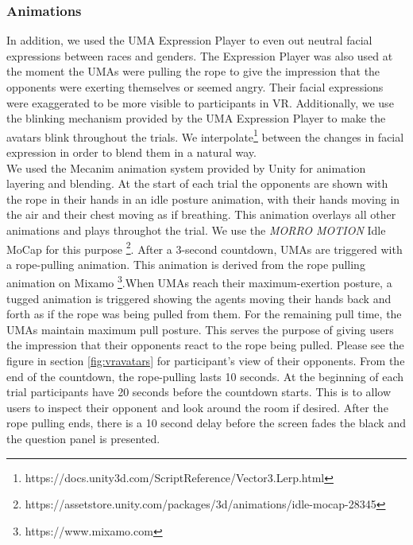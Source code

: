 \subsubsection{Animations}
\label{subsection:animation}
 In addition, we used the UMA Expression Player to even out neutral facial expressions between races and genders. The Expression Player was also used at the moment the UMAs were pulling the rope to give the impression that the opponents were exerting themselves or seemed angry. Their facial expressions were exaggerated to be more visible to participants in VR. Additionally, we use the blinking mechanism provided by the UMA Expression Player to make the avatars blink throughout the trials. We interpolate\footnote{https://docs.unity3d.com/ScriptReference/Vector3.Lerp.html} between the changes in facial expression in order to blend them in a natural way.
\\
We used the Mecanim animation system provided by Unity for animation layering and blending. At the start of each trial the opponents are shown with the rope in their hands in an idle posture animation, with their hands moving in the air and their chest moving as if breathing. This animation overlays all other animations and plays throughot the trial. We use the \textit{MORRO MOTION} Idle MoCap for this purpose \footnote{https://assetstore.unity.com/packages/3d/animations/idle-mocap-28345}. After a 3-second countdown, UMAs are triggered with a rope-pulling animation. This animation is derived from the rope pulling animation on Mixamo \footnote{https://www.mixamo.com}.When UMAs reach their maximum-exertion posture, a tugged animation is triggered showing the agents moving their hands back and forth as if the rope was being pulled from them. For the remaining pull time, the UMAs maintain maximum pull posture. This serves the purpose of giving users the impression that their opponents react to the rope being pulled. Please see the figure in section \ref{fig:vravatars} for participant's view of their opponents. From the end of the countdown, the rope-pulling lasts 10 seconds. At the beginning of each trial participants have 20 seconds before the countdown starts. This is to allow users to inspect their opponent and look around the room if desired. After the rope pulling ends, there is a 10 second delay before the screen fades the black and the question panel is presented. 
